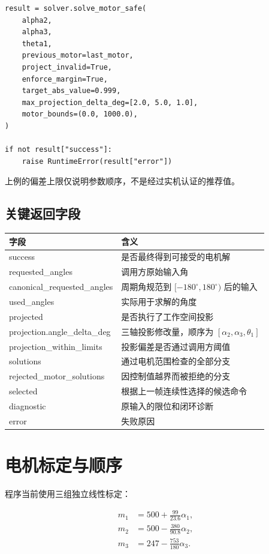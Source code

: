 \documentclass[11pt,a4paper,fontset=none]{ctexart}
\begin{document}
\begin{lstlisting}[style=pythonstyle]
result = solver.solve_motor_safe(
    alpha2,
    alpha3,
    theta1,
    previous_motor=last_motor,
    project_invalid=True,
    enforce_margin=True,
    target_abs_value=0.999,
    max_projection_delta_deg=[2.0, 5.0, 1.0],
    motor_bounds=(0.0, 1000.0),
)

if not result["success"]:
    raise RuntimeError(result["error"])
\end{lstlisting}

上例的偏差上限仅说明参数顺序，不是经过实机认证的推荐值。

\subsection{关键返回字段}

\begin{longtable}{>{\raggedright\arraybackslash\ttfamily\small}p{}p{}}
\toprule
字段 & 含义\\
\midrule
\endhead
success & 是否最终得到可接受的电机解\\
requested\_angles & 调用方原始输入角\\
canonical\_requested\_angles & 周期角规范到 $[-180^\circ,180^\circ)$ 后的输入\\
used\_angles & 实际用于求解的角度\\
projected & 是否执行了工作空间投影\\
projection.angle\_delta\_deg & 三轴投影修改量，顺序为 $[\alpha_2,\alpha_3,\theta_1]$\\
projection\_within\_limits & 投影偏差是否通过调用方阈值\\
solutions & 通过电机范围检查的全部分支\\
rejected\_motor\_solutions & 因控制值越界而被拒绝的分支\\
selected & 根据上一帧连续性选择的候选命令\\
diagnostic & 原输入的限位和闭环诊断\\
error & 失败原因\\
\bottomrule
\end{longtable}

\section{电机标定与顺序}

程序当前使用三组独立线性标定：

\[
\begin{aligned}
m_1 &= 500 + \frac{99}{23.6}\alpha_1,\\
m_2 &= 500 - \frac{380}{90.8}\alpha_2,\\
m_3 &= 247 - \frac{753}{180}\alpha_3.
\end{aligned}
\]
\end{document}

